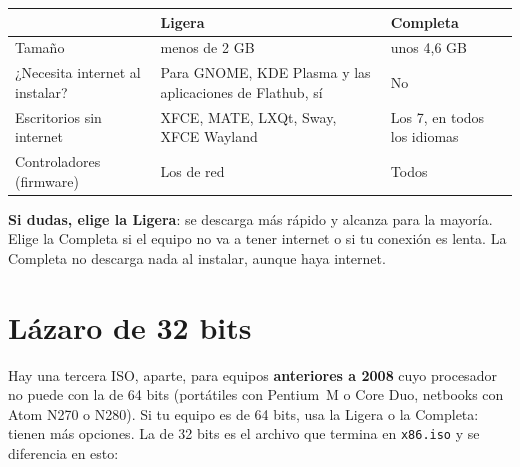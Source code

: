 \begin{center}
\begin{tabularx}{\textwidth}{lXX}
\toprule
 & \textbf{Ligera} & \textbf{Completa} \\
\midrule
Tamaño & menos de 2 GB & unos 4,6 GB \\
¿Necesita internet al instalar? & Para GNOME, KDE Plasma y las aplicaciones
  de Flathub, sí & No \\
Escritorios sin internet & XFCE, MATE, LXQt, Sway, XFCE Wayland & Los 7, en
  todos los idiomas \\
Controladores (firmware) & Los de red & Todos \\
\bottomrule
\end{tabularx}
\end{center}

\textbf{Si dudas, elige la Ligera}: se descarga más rápido y alcanza para la
mayoría. Elige la Completa si el equipo no va a tener internet o si tu
conexión es lenta. La Completa no descarga nada al instalar, aunque
haya internet.

\section{Lázaro de 32 bits}\label{sec:32-bits}

Hay una tercera ISO, aparte, para equipos \textbf{anteriores a 2008} cuyo
procesador no puede con la de 64 bits (portátiles con Pentium~M o Core
Duo, netbooks con Atom N270 o N280). Si tu equipo es de 64 bits, usa la
Ligera o la Completa: tienen más opciones. La de 32 bits es el archivo
que termina en \texttt{x86.iso} y se diferencia en esto:

